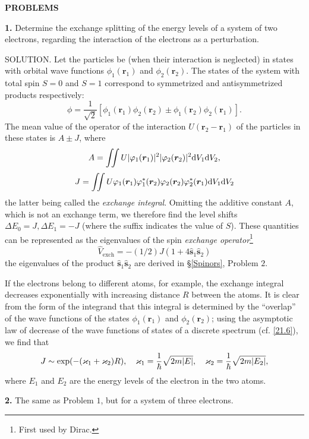 {\small
\textbf{PROBLEMS}


\textbf{1.} Determine the exchange splitting of the energy levels of a system of two electrons, regarding the interaction of the electrons as a perturbation.





SOLUTION. Let the particles be (when their interaction is neglected) in states with orbital wave functions $ \phi_1(\bm{r}_1) $ and $ \phi_2(\bm{r}_2) $. The states of the system with total spin $ S = 0 $ and $ S = 1 $ correspond to symmetrized and antisymmetrized products respectively:
\[ \phi=\frac{1}{\sqrt{2}}\left[\phi_1(\bm{r}_1)\phi_2(\bm{r}_2)\pm\phi_1(\bm{r}_2)\phi_2(\bm{r}_1) \right]. \]
The mean value of the operator of the interaction $ U (\bm{r}_2-\bm{r}_1) $ of the particles in these states is $ A\pm J $, where
\[ A=\iint U|\varphi_1(\bm{r}_1)|^2|\varphi_2(\bm{r}_2)|^2\mathrm{d} V_1\mathrm{d} V_2, \]
\[ J=\iint U\varphi_1(\bm{r}_1)\varphi_1^*(\bm{r}_2)\varphi_2(\bm{r}_2)\varphi_2^*(\bm{r}_1)\mathrm{d} V_1\mathrm{d} V_2 \]
the latter being called the \textit{exchange integral}. Omitting the additive constant $ A $, which is not an exchange term, we therefore find the level shifts $ \Delta E_0 = J, \Delta E_1 = -J $ (where the suffix indicates the value of $ S $). These quantities can be represented as the eigenvalues of the spin \textit{exchange operator}\footnote{First used by Dirac.}
\begin{equation}\label{62-1-1}
\hat{V}_{\text{exch}}=-(1/2)J(1+4\hat{\bm{s}}_1\hat{\bm{s}}_2)\tag{1}
\end{equation}
the eigenvalues of the product $\hat{\bm{s}}_1\hat{\bm{s}}_2  $ are derived in \S\ref{Spinors}, Problem $ 2 $.

If the electrons belong to different atoms, for example, the exchange integral decreases exponentially with increasing distance $ R $ between the atoms. It is clear from the form of the integrand that this integral is determined by the “overlap” of the wave functions of the states $\phi_1(\bm{r}_1) $ and $ \phi_2(\bm{r}_2) $; using the asymptotic law of decrease of the wave functions of states of a discrete spectrum (cf. \eqref{21.6}), we find that
\[ J\sim\exp(-(\varkappa_1+\varkappa_2)R),\quad\varkappa_1=\frac{1}{\hbar}\sqrt{2m|E|},\quad\varkappa_2=\frac{1}{\hbar}\sqrt{2m|E_2|}, \]
where $ E_1 $ and $ E_2 $ are the energy levels of the electron in the two atoms.





\textbf{2.} The same as Problem $ 1 $, but for a system of three electrons.





}

